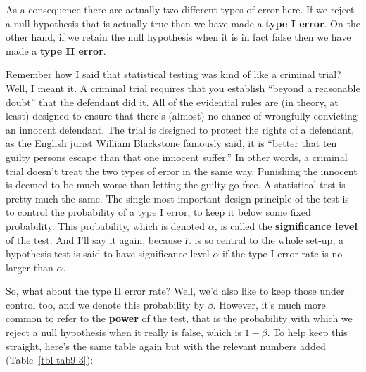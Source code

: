 \documentclass[
  a4paper,
]{book}
\begin{document}
\begin{table}

\caption{\label{tbl-tab9-2}Null hypothesis statistical testing (NHST)}

\centering
{}

\end{table}%

As a consequence there are actually two different types of error here.
If we reject a null hypothesis that is actually true then we have made a
\textbf{type I error}. On the other hand, if we retain the null
hypothesis when it is in fact false then we have made a \textbf{type II
error}.

Remember how I said that statistical testing was kind of like a criminal
trial? Well, I meant it. A criminal trial requires that you establish
``beyond a reasonable doubt'' that the defendant did it. All of the
evidential rules are (in theory, at least) designed to ensure that
there's (almost) no chance of wrongfully convicting an innocent
defendant. The trial is designed to protect the rights of a defendant,
as the English jurist William Blackstone famously said, it is ``better
that ten guilty persons escape than that one innocent suffer.'' In other
words, a criminal trial doesn't treat the two types of error in the same
way. Punishing the innocent is deemed to be much worse than letting the
guilty go free. A statistical test is pretty much the same. The single
most important design principle of the test is to control the
probability of a type I error, to keep it below some fixed probability.
This probability, which is denoted \(\alpha\), is called the
\textbf{significance level} of the test. And I'll say it again, because
it is so central to the whole set-up, a hypothesis test is said to have
significance level \(\alpha\) if the type I error rate is no larger than
\(\alpha\).

So, what about the type II error rate? Well, we'd also like to keep
those under control too, and we denote this probability by \(\beta\).
However, it's much more common to refer to the \textbf{power} of the
test, that is the probability with which we reject a null hypothesis
when it really is false, which is \(1 - \beta\). To help keep this
straight, here's the same table again but with the relevant numbers
added (Table~\ref{tbl-tab9-3}):
\end{document}
